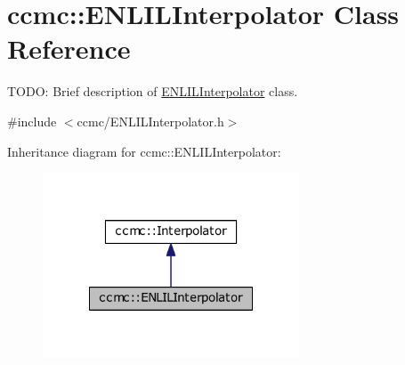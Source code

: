 \hypertarget{classccmc_1_1_e_n_l_i_l_interpolator}{\section{ccmc\-:\-:E\-N\-L\-I\-L\-Interpolator Class Reference}
\label{classccmc_1_1_e_n_l_i_l_interpolator}
}


T\-O\-D\-O\-: Brief description of \hyperlink{classccmc_1_1_e_n_l_i_l_interpolator}{E\-N\-L\-I\-L\-Interpolator} class.  




{\ttfamily \#include $<$ccmc/\-E\-N\-L\-I\-L\-Interpolator.\-h$>$}



Inheritance diagram for ccmc\-:\-:E\-N\-L\-I\-L\-Interpolator\-:\nopagebreak
\begin{figure}[H]
\begin{center}
\leavevmode
\includegraphics[width=216pt]{classccmc_1_1_e_n_l_i_l_interpolator__inherit__graph}
\end{center}
\end{figure}


